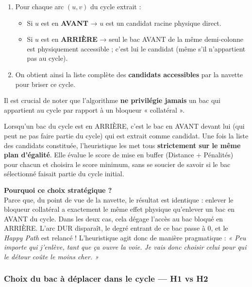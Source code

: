 \documentclass[12pt,a4paper]{article}
\begin{document}
\begin{enumerate}[noitemsep]
  \item Pour chaque arc $(u, v)$ du cycle extrait :
        \begin{itemize}[noitemsep]
          \item Si $u$ est en \textbf{AVANT} → $u$ est un candidat
                racine physique direct.
          \item Si $u$ est en \textbf{ARRIÈRE} → seul le bac AVANT
                de la même demi-colonne est physiquement accessible ;
                c'est lui le candidat (même s'il n'appartient pas au
                cycle).
        \end{itemize}
  \item On obtient ainsi la liste complète des \textbf{candidats accessibles} par la navette pour briser ce cycle.
\end{enumerate}

\begin{tcolorbox}[colback=blue!5, colframe=blue!60!black, fonttitle=\bfseries, title=Spécificité technique : Égalité de traitement des bloqueurs]
Il est crucial de noter que l'algorithme \textbf{ne privilégie jamais} un bac qui appartient au cycle par rapport à un bloqueur « collatéral ». 

Lorsqu'un bac du cycle est en ARRIÈRE, c'est le bac en AVANT devant lui (qui peut ne pas faire partie du cycle) qui est extrait comme candidat. Une fois la liste des candidats constituée, l'heuristique les met tous \textbf{strictement sur le même plan d'égalité}. Elle évalue le score de mise en buffer (Distance + Pénalités) pour chacun et choisira le score minimum, sans se soucier de savoir si le bac sélectionné faisait partie du cycle initial.

\textbf{Pourquoi ce choix stratégique ?} \\
Parce que, du point de vue de la navette, le résultat est identique : enlever le bloqueur collatéral a exactement le même effet physique qu'enlever un bac en AVANT du cycle. Dans les deux cas, cela dégage l'accès au bac bloqué en ARRIÈRE. L'arc DUR disparaît, le degré entrant de ce bac passe à 0, et le \emph{Happy Path} est relancé ! L'heuristique agit donc de manière pragmatique : \emph{« Peu importe qui j'enlève, tant que ça ouvre la voie. Je vais donc choisir celui pour qui le détour coûte le moins cher. »}
\end{tcolorbox}

\subsubsection{Choix du bac à déplacer dans le cycle — H1 vs H2}
\end{document}
